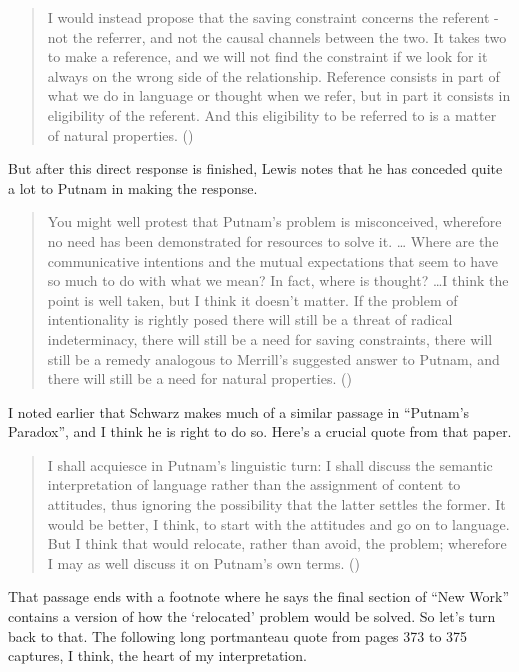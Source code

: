 \documentclass[
  11pt,
  letterpaper,
  DIV=11,
  numbers=noendperiod,
  twoside]{scrartcl}
\begin{document}
\begin{quote}
I would instead propose that the saving constraint concerns the referent
- not the referrer, and not the causal channels between the two. It
takes two to make a reference, and we will not find the constraint if we
look for it always on the wrong side of the relationship. Reference
consists in part of what we do in language or thought when we refer, but
in part it consists in eligibility of the referent. And this eligibility
to be referred to is a matter of natural properties.
()
\end{quote}

But after this direct response is finished, Lewis notes that he has
conceded quite a lot to Putnam in making the response.

\begin{quote}
You might well protest that Putnam's problem is misconceived, wherefore
no need has been demonstrated for resources to solve it. \ldots{} Where
are the communicative intentions and the mutual expectations that seem
to have so much to do with what we mean? In fact, where is thought?
\ldots I think the point is well taken, but I think it doesn't matter.
If the problem of intentionality is rightly posed there will still be a
threat of radical indeterminacy, there will still be a need for saving
constraints, there will still be a remedy analogous to Merrill's
suggested answer to Putnam, and there will still be a need for natural
properties. ()
\end{quote}

I noted earlier that Schwarz makes much of a similar passage in
``Putnam's Paradox'', and I think he is right to do so. Here's a crucial
quote from that paper.

\begin{quote}
I shall acquiesce in Putnam's linguistic turn: I shall discuss the
semantic interpretation of language rather than the assignment of
content to attitudes, thus ignoring the possibility that the latter
settles the former. It would be better, I think, to start with the
attitudes and go on to language. But I think that would relocate, rather
than avoid, the problem; wherefore I may as well discuss it on Putnam's
own terms. ()
\end{quote}

That passage ends with a footnote where he says the final section of
``New Work'' contains a version of how the `relocated' problem would be
solved. So let's turn back to that. The following long portmanteau quote
from pages 373 to 375 captures, I think, the heart of my interpretation.
\end{document}
